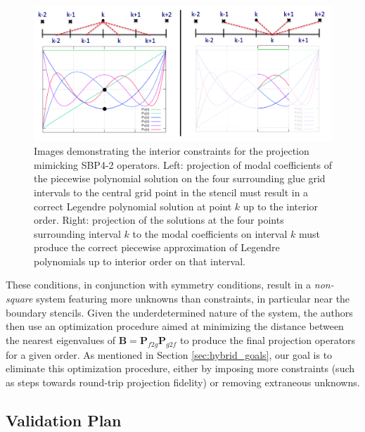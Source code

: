 \begin{figure}
\centering
\includegraphics[width=0.9\linewidth,trim=4 4 4 4,clip]{figures/projection_layout.png}
\caption{Images demonstrating the interior constraints for the projection mimicking SBP4-2
	 operators. Left: projection of modal coefficients of the piecewise polynomial solution
	 on the four surrounding glue grid intervals to the central grid point in the stencil must
	 result in a correct Legendre polynomial solution at point $k$ up to the interior order.
	 Right: projection of the solutions at the four points surrounding interval $k$ to the
	 modal coefficients on interval $k$ must produce the correct piecewise approximation of
	 Legendre polynomials up to interior order on that interval.}
\label{fig:projection_layout}
\end{figure}

These conditions, in conjunction with symmetry conditions, result in a \emph{non-square}
system featuring more unknowns than constraints, in particular near the boundary stencils.
Given the underdetermined nature of the system, the authors then use an optimization
procedure aimed at minimizing the distance between the nearest eigenvalues of $\pmb{B} =
\pmb{P}_{f2g}\pmb{P}_{g2f}$ to produce the final projection operators for a given order.
As mentioned in Section \ref{sec:hybrid_goals}, our goal is to eliminate this optimization
procedure, either by imposing more constraints (such as steps towards round-trip projection
fidelity) or removing extraneous unknowns.

\subsection{Validation Plan}

